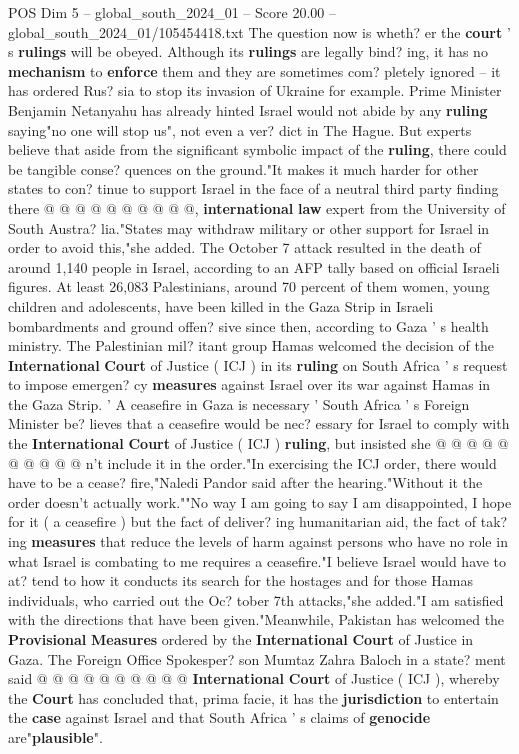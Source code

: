 \begin{textsample}{POS Dim 5 – global\_south\_2024\_01 – Score 20.00 – global\_south\_2024\_01/105454418.txt}
The question now is wheth? er the \textbf{court} ' s \textbf{rulings} will be obeyed.
Although its \textbf{rulings} are legally bind? ing, it has no \textbf{mechanism} to \textbf{enforce} them and they are sometimes com? pletely ignored -- it has ordered Rus? sia to stop its invasion of Ukraine for example.
Prime Minister Benjamin Netanyahu has already hinted Israel would not abide by any \textbf{ruling} saying"no one will stop us", not even a ver? dict in The Hague.
But experts believe that aside from the significant symbolic impact of the \textbf{ruling}, there could be tangible conse? quences on the ground."It makes it much harder for other states to con? tinue to support Israel in the face of a neutral third party finding there @ @ @ @ @ @ @ @ @ @, \textbf{international} \textbf{law} expert from the University of South Austra? lia."States may withdraw military or other support for Israel in order to avoid this,"she added.
The October 7 attack resulted in the death of around 1,140 people in Israel, according to an AFP tally based on official Israeli figures.
At least 26,083 Palestinians, around 70 percent of them women, young children and adolescents, have been killed in the Gaza Strip in Israeli bombardments and ground offen? sive since then, according to Gaza ' s health ministry.
The Palestinian mil? itant group Hamas welcomed the decision of the \textbf{International} \textbf{Court} of Justice ( ICJ ) in its \textbf{ruling} on South Africa ' s request to impose emergen? cy \textbf{measures} against Israel over its war against Hamas in the Gaza Strip. ' A ceasefire in Gaza is necessary ' South Africa ' s Foreign Minister be? lieves that a ceasefire would be nec? essary for Israel to comply with the \textbf{International} \textbf{Court} of Justice ( ICJ ) \textbf{ruling}, but insisted she @ @ @ @ @ @ @ @ @ @ n't include it in the order."In exercising the ICJ order, there would have to be a cease? fire,"Naledi Pandor said after the hearing."Without it the order doesn't actually work.""No way I am going to say I am disappointed, I hope for it ( a ceasefire ) but the fact of deliver? ing humanitarian aid, the fact of tak? ing \textbf{measures} that reduce the levels of harm against persons who have no role in what Israel is combating to me requires a ceasefire."I believe Israel would have to at? tend to how it conducts its search for the hostages and for those Hamas individuals, who carried out the Oc? tober 7th attacks,"she added."I am satisfied with the directions that have been given."Meanwhile, Pakistan has welcomed the \textbf{Provisional} \textbf{Measures} ordered by the \textbf{International} \textbf{Court} of Justice in Gaza.
The Foreign Office Spokesper? son Mumtaz Zahra Baloch in a state? ment said @ @ @ @ @ @ @ @ @ @ \textbf{International} \textbf{Court} of Justice ( ICJ ), whereby the \textbf{Court} has concluded that, prima facie, it has the \textbf{jurisdiction} to entertain the \textbf{case} against Israel and that South Africa ' s claims of \textbf{genocide} are"\textbf{plausible}".


\end{textsample}
